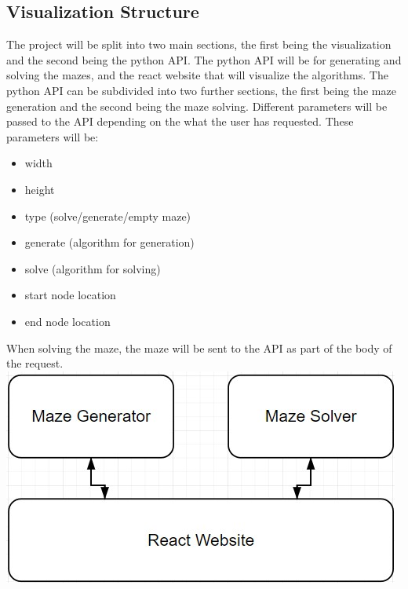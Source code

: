 \documentclass[titlepage]{article}
\begin{document}
\subsection{Visualization Structure}
The project will be split into two main sections, the first being the visualization and the second being the python API.
The python API will be for generating and solving the mazes, and the react website that will visualize the algorithms. The python API can be subdivided into two further sections, the first being the maze generation and the second being the maze solving. Different parameters will be passed to the API depending on the what the user has requested. These parameters will be:
\begin{itemize}
    \item width
    \item height
    \item type (solve/generate/empty maze)
    \item generate (algorithm for generation)
    \item solve (algorithm for solving)
    \item start node location
    \item end node location
\end{itemize} 

When solving the maze, the maze will be sent to the API as part of the body of the request.
\newline
\includegraphics[width=\linewidth]{assets/structure.jpg}
\end{document}
